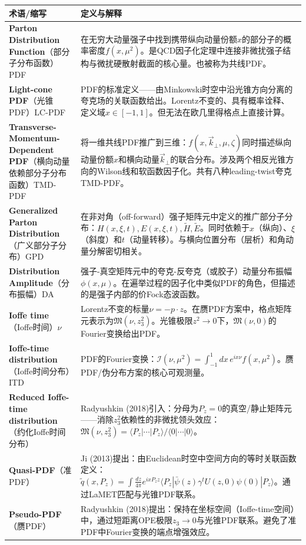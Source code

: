 \documentclass[12pt,a4paper]{ctexart}
\begin{document}
\begin{longtable}{p{3.5cm}p{9cm}}
\toprule
\textbf{术语/缩写} & \textbf{定义与解释} \\
\midrule
\endhead
\textbf{Parton Distribution Function}（部分子分布函数）PDF& 在无穷大动量强子中找到携带纵向动量份额$x$的部分子的概率密度$f(x,\mu^2)$。是QCD因子化定理中连接非微扰强子结构与微扰硬散射截面的核心量。也被称为共线PDF。\\
\textbf{Light-cone PDF}（光锥PDF）LC-PDF& PDF的标准定义——由Minkowski时空中沿光锥方向分离的夸克场的关联函数给出。Lorentz不变的、具有概率诠释、定义域$x\in[-1,1]$。但无法在欧几里得格点上直接计算。\\
\textbf{Transverse-Momentum-Dependent PDF}（横向动量依赖部分子分布函数）TMD-PDF& 将一维共线PDF推广到三维：$f(x,\vec k_\perp,\mu,\zeta)$同时描述纵向动量份额$x$和横向动量$\vec k_\perp$的联合分布。涉及两个相反光锥方向的Wilson线和软函数因子化。共有八种leading-twist夸克TMD-PDF。\\
\textbf{Generalized Parton Distribution}（广义部分子分布）GPD& 在非对角（off-forward）强子矩阵元中定义的推广部分子分布：$H(x,\xi,t), E(x,\xi,t), \tilde H, \tilde E$。同时依赖于$x$（纵向）、$\xi$（斜度）和$t$（动量转移）。与横向位置分布（层析）和角动量分解密切相关。\\
\textbf{Distribution Amplitude}（分布振幅）DA& 强子-真空矩阵元中的夸克-反夸克（或胶子）动量分布振幅$\phi(x,\mu)$。在遍举过程的因子化中类似PDF的角色，但描述的是强子内部的价Fock态波函数。\\
\textbf{Ioffe time}（Ioffe时间）$\nu$& Lorentz不变的标量$\nu = -p\cdot z$。在赝PDF方案中，格点矩阵元表示为$\mathfrak{M}(\nu,z_3^2)$。光锥极限$z^2\to 0$下，$\mathfrak{M}(\nu,0)$的Fourier变换给出PDF。\\
\textbf{Ioffe-time distribution}（Ioffe时间分布）ITD& PDF的Fourier变换：$\mathcal{I}(\nu,\mu^2) = \int_{-1}^1 dx\, e^{i x \nu} f(x,\mu^2)$。赝PDF/伪分布方案的核心可观测量。\\
\textbf{Reduced Ioffe-time distribution}（约化Ioffe时间分布）& Radyushkin (2018)引入：分母为$P_z=0$的真空/静止矩阵元——消除$z_3^2$依赖性的非微扰领头效应：$\mathfrak{M}(\nu,z_3^2) = \langle P_z|\cdots|P_z\rangle / \langle 0|\cdots|0\rangle$。\\
\textbf{Quasi-PDF}（准PDF）& Ji (2013)提出：由Euclidean时空中空间方向的等时关联函数定义：$\tilde q(x,P_z) = \int \frac{dz}{4\pi} e^{ixP_z z} \langle P_z|\bar\psi(z)\gamma^t U(z,0)\psi(0)|P_z\rangle$。通过LaMET匹配与光锥PDF联系。\\
\textbf{Pseudo-PDF}（赝PDF）& Radyushkin (2018)提出：保持在坐标空间（Ioffe-time空间）中，通过短距离OPE极限$z_3\to 0$与光锥PDF联系。避免了准PDF中Fourier变换的端点增强效应。\\

\end{longtable}
\end{document}
